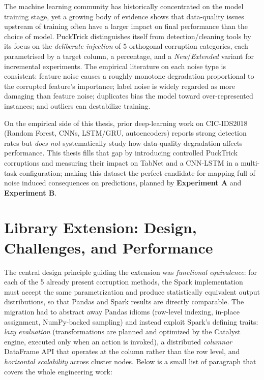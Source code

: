 \documentclass[a4paper, 9pt]{extarticle}
\begin{document}
The machine learning community has historically concentrated on the model training stage, yet a growing body of evidence shows that data-quality issues upstream of training often have a larger impact on final performance than the choice of model. PuckTrick distinguishes itself from detection/cleaning tools by its focus on the \emph{deliberate injection} of 5 orthogonal corruption categories, each parametrised by a target column, a percentage, and a \emph{New}/\emph{Extended} variant for incremental experiments. The empirical literature on each noise type is consistent: feature noise causes a roughly monotone degradation proportional to the corrupted feature's importance; label noise is widely regarded as more damaging than feature noise; duplicates bias the model toward over-represented instances; and outliers can destabilize training. 

On the empirical side of this thesis, prior deep-learning work on CIC-IDS2018 (Random Forest, CNNs, LSTM/GRU, autoencoders) reports strong detection rates but \emph{does not} systematically study how data-quality degradation affects performance. This thesis fills that gap by introducing controlled PuckTrick corruptions and measuring their impact on TabNet and a CNN-LSTM in a multi-task configuration; making this dataset the perfect candidate for mapping full of noise induced consequences on predictions, planned by \textbf{Experiment A} and \textbf{Experiment B}.

\section{Library Extension: Design, Challenges, and Performance}

The central design principle guiding the extension was \emph{functional equivalence}: for each of the 5 already present corruption methods, the Spark implementation must accept the same parametrization and produce statistically equivalent output distributions, so that Pandas and Spark results are directly comparable. The migration had to abstract away Pandas idioms (row-level indexing, in-place assignment, NumPy-backed sampling) and instead exploit Spark's defining traits: \emph{lazy evaluation} (transformations are planned and optimized by the Catalyst engine, executed only when an action is invoked), a distributed \emph{columnar} DataFrame API that operates at the column rather than the row level, and \emph{horizontal scalability} across cluster nodes. Below is a small list of paragraph that covers the whole engineering work:
\end{document}
